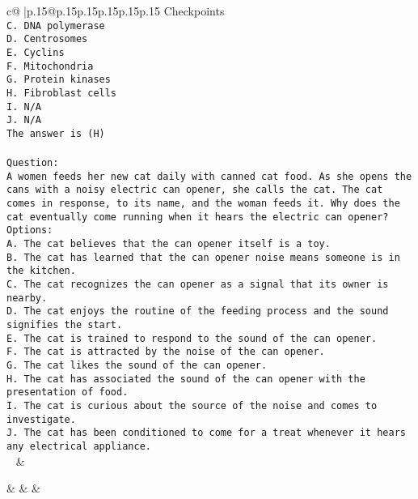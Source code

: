 \documentclass{article}
\begin{document}
{\begin{supertabular}{c@{$\;$}|p{.15\linewidth}@{}p{.15\linewidth}p{.15\linewidth}p{.15\linewidth}p{.15\linewidth}p{.15\linewidth}}
{{{Checkpoints\\ \tt C. DNA polymerase\\ \tt D. Centrosomes\\ \tt E. Cyclins\\ \tt F. Mitochondria\\ \tt G. Protein kinases\\ \tt H. Fibroblast cells\\ \tt I. N/A\\ \tt J. N/A\\ \tt The answer is (H)\\ \tt \\ \tt Question:\\ \tt A women feeds her new cat daily with canned cat food. As she opens the cans with a noisy electric can opener, she calls the cat. The cat comes in response, to its name, and the woman feeds it. Why does the cat eventually come running when it hears the electric can opener?\\ \tt Options:\\ \tt A. The cat believes that the can opener itself is a toy.\\ \tt B. The cat has learned that the can opener noise means someone is in the kitchen.\\ \tt C. The cat recognizes the can opener as a signal that its owner is nearby.\\ \tt D. The cat enjoys the routine of the feeding process and the sound signifies the start.\\ \tt E. The cat is trained to respond to the sound of the can opener.\\ \tt F. The cat is attracted by the noise of the can opener.\\ \tt G. The cat likes the sound of the can opener.\\ \tt H. The cat has associated the sound of the can opener with the presentation of food.\\ \tt I. The cat is curious about the source of the noise and comes to investigate.\\ \tt J. The cat has been conditioned to come for a treat whenever it hears any electrical appliance.\\ \tt  
	  } 
	   } 
	   } 
	 & \\ 
 

    \theutterance {}  

    &  
	 & & \\ 
 


\end{supertabular}}
\end{document}
